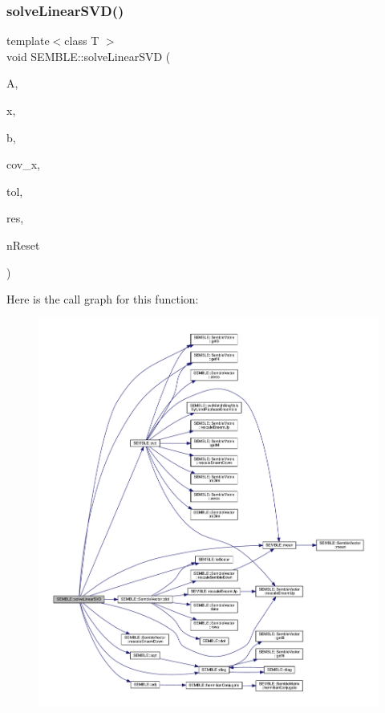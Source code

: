 \subsubsection{\texorpdfstring{solveLinearSVD()}{solveLinearSVD()}\hspace{0.1cm}{\footnotesize\ttfamily [2/2]}}
{\footnotesize\ttfamily template$<$class T $>$ \\
void S\+E\+M\+B\+L\+E\+::solve\+Linear\+S\+VD (\begin{DoxyParamCaption}\item[{const \mbox{\hyperlink{structSEMBLE_1_1SembleMatrix}{Semble\+Matrix}}$<$ T $>$ \&}]{A,  }\item[{\mbox{\hyperlink{structSEMBLE_1_1SembleVector}{Semble\+Vector}}$<$ T $>$ \&}]{x,  }\item[{const \mbox{\hyperlink{structSEMBLE_1_1SembleVector}{Semble\+Vector}}$<$ T $>$ \&}]{b,  }\item[{\mbox{\hyperlink{structSEMBLE_1_1SembleMatrix}{Semble\+Matrix}}$<$ T $>$ \&}]{cov\+\_\+x,  }\item[{const double}]{tol,  }\item[{double \&}]{res,  }\item[{int \&}]{n\+Reset }\end{DoxyParamCaption})}

Here is the call graph for this function\+:
\nopagebreak
\begin{figure}[H]
\begin{center}
\leavevmode
\includegraphics[width=350pt]{d7/dfd/namespaceSEMBLE_ac312bc4ecb1ed4d73ae750e82fd799c1_cgraph}
\end{center}
\end{figure}
\mbox{\label{namespaceSEMBLE_a13a03156f292e8edb0d4d9e26a3c8de2}} 
